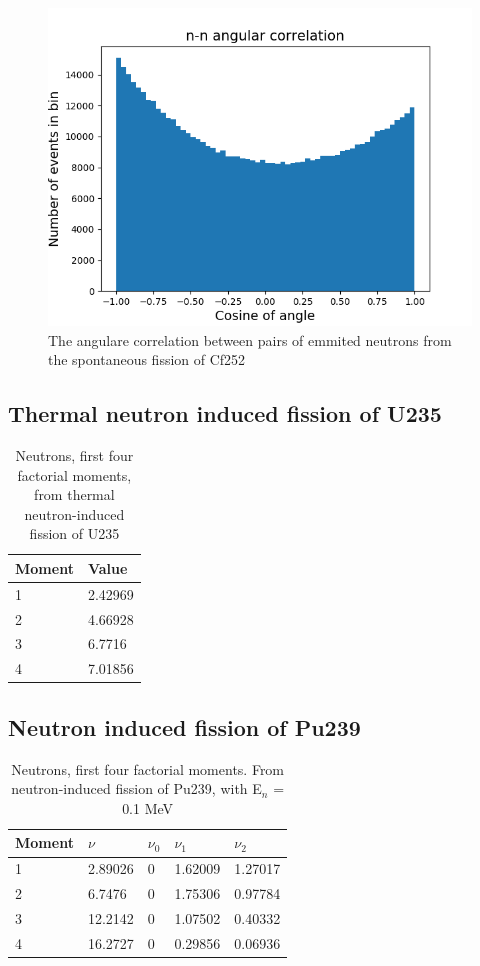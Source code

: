 \documentclass[]{article}
\begin{document}
\begin{figure} [H]
	\centering
	\includegraphics[scale=0.7]{Cf252_sf_n_n_ang_corr.png}
	\caption{The angulare correlation between pairs of emmited neutrons from the spontaneous fission of Cf252}
	\label{fig:Cf252_sf_n_n_ang_corr}
\end{figure}
	
\subsection{Thermal neutron induced fission of U235}

\begin{table} [H]
	\centering
	\caption{Neutrons, first four factorial moments, from thermal neutron-induced fission of U235 }
	\begin{tabularx}{\textwidth}{XX} \hline
		\label{U235_n_moments}
		Moment & Value \\ \hline
		1 & 2.42969 \\
		2 & 4.66928\\
		3 & 6.7716\\
		4 & 7.01856\\ 
	\end{tabularx}
\end{table}

\subsection{Neutron induced fission of Pu239}

\begin{table} [H]
	\centering
	\caption{Neutrons, first four factorial moments. From neutron-induced fission of Pu239, with E$_n$ = 0.1 MeV }
	\begin{tabularx}{\textwidth}{XXXXX} \hline
		\label{Pu239_n_moments_0_1}
		Moment & $\nu$ & $\nu_0$ & $\nu_1$ & $\nu_2$ \\ \hline
		1 & 2.89026 & 0 &1.62009 & 1.27017\\
		2 & 6.7476 & 0 & 1.75306 & 0.97784\\
		3 & 12.2142 & 0 & 1.07502 & 0.40332\\
		4 & 16.2727 & 0 & 0.29856 & 0.06936\\ 
	\end{tabularx}
\end{table}
\end{document}

